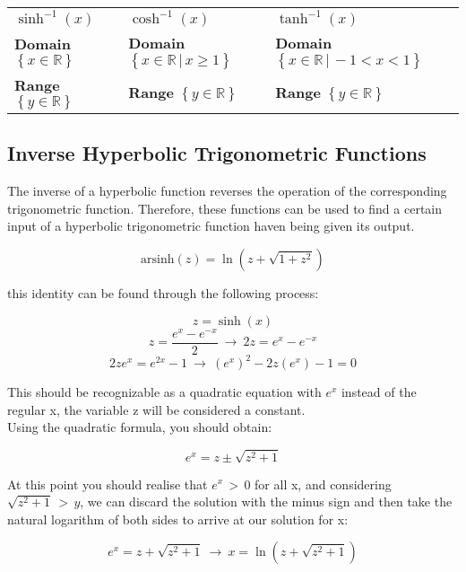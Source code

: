 \documentclass{article}
\begin{document}
\hspace{5pt} \begin{tabular}{lll}
    
    \(\sinh^{-1}(x)\) \hspace{85pt} & \(\cosh^{-1}(x)\) \hspace{85pt} & \(\tanh^{-1}(x)\) \\
    
    \textbf{Domain} \(\left\{x\in\mathbb{R}\right\}\) & \textbf{Domain} \(\left\{x\in\mathbb{R}\,|\,x\geq1\right\}\) & \textbf{Domain} \(\left\{x\in\mathbb{R}\,|\,-1<x<1\right\}\) \\
    
    \textbf{Range} \(\left\{y\in\mathbb{R}\right\}\) & \textbf{Range} \(\left\{y\in\mathbb{R}\right\}\) & \textbf{Range} \(\left\{y\in\mathbb{R}\right\}\)

\end{tabular}

\subsection{Inverse Hyperbolic Trigonometric Functions}

The inverse of a hyperbolic function reverses the operation of the corresponding trigonometric function. Therefore, these functions can be used to find a certain input of a hyperbolic trigonometric function haven being given its output.

\[\textrm{arsinh}\left(z\right)=\ln\left(z+\sqrt{1+z^2}\right)\]

\noindent this identity can be found through the following process:

\[z=\sinh\left(x\right)\]
\[z=\frac{e^x-e^{-x}}{2} \: \rightarrow \: 2z=e^x-e^{-x}\]
\[2ze^x=e^{2x}-1 \: \rightarrow \: \left(e^x\right)^2-2z\left(e^x\right)-1=0\]

\noindent This should be recognizable as a quadratic equation with \(e^x\) instead of the regular \textrm{x}, the variable \textrm{z} will be considered a constant. \\
Using the quadratic formula, you should obtain:

\[e^x=z\pm\sqrt{z^2+1}\]

\noindent At this point you should realise that \(e^x\,>\,0\) for all \textrm{x}, and considering \(\sqrt{z^2+1}\,>\, y\), we can discard the solution with the minus sign and then take the natural logarithm of both sides to arrive at our solution for \textrm{x}:

\[e^x=z+\sqrt{z^2+1} \: \rightarrow \: x=\ln\left(z+\sqrt{z^2+1}\right)\]
\end{document}
